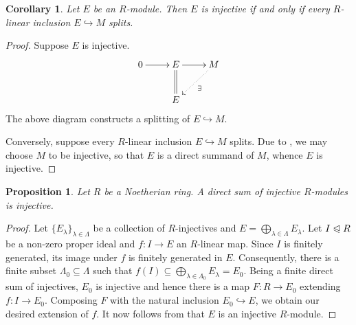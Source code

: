 \documentclass[10pt]{article}
\theoremstyle{thmstyle}
\newtheorem{proposition}[theorem]{Proposition}
\theoremstyle{defstyle}
\newtheorem{corollary}[theorem]{Corollary}
\newcommand{\into}{\hookrightarrow}
\newcommand{\noreq}{\trianglelefteqslant}
\begin{document}
\begin{corollary}
    Let $E$ be an $R$-module. Then $E$ is injective if and only if every $R$-linear inclusion $E\into M$ splits.
\end{corollary}
\begin{proof}
    Suppose $E$ is injective.
    \begin{equation*}
        \xymatrix {
            0\ar[r] & E\ar[r]\ar@{=}[d] & M\ar@{.>}[ld]^{\exists}\\
            & E & 
        }
    \end{equation*}
    The above diagram constructs a splitting of $E\into M$.

    Conversely, suppose every $R$-linear inclusion $E\into M$ splits. Due to , we may choose $M$ to be injective, so that $E$ is a direct summand of $M$, whence $E$ is injective.
\end{proof}

\begin{proposition}
    Let $R$ be a Noetherian ring. A direct sum of injective $R$-modules is injective.
\end{proposition}
\begin{proof}
    Let $\{E_\lambda\}_{\lambda\in\Lambda}$ be a collection of $R$-injectives and $E = \bigoplus_{\lambda\in\Lambda} E_\lambda$. Let $I\noreq R$ be a non-zero proper ideal and $f: I\to E$ an $R$-linear map. Since $I$ is finitely generated, its image under $f$ is finitely generated in $E$. Consequently, there is a finite subset $\Lambda_0\subseteq\Lambda$ such that $f(I)\subseteq\bigoplus_{\lambda\in\Lambda_0} E_\lambda = E_0$. Being a finite direct sum of injectives, $E_0$ is injective and hence there is a map $F: R\to E_0$ extending $f: I\to E_0$. Composing $F$ with the natural inclusion $E_0\into E$, we obtain our desired extension of $f$. It now follows from  that $E$ is an injective $R$-module.
\end{proof}
\end{document}
